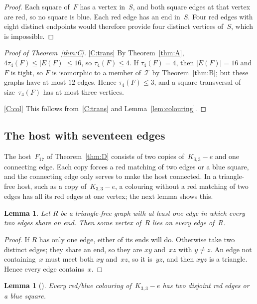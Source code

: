 \documentclass[11pt,letterpaper]{article}
\numberwithin{equation}{section}
\theoremstyle{plain}
\newtheorem{lemma}[theorem]{Lemma}
\theoremstyle{definition}
\theoremstyle{remark}
\newcommand{\Kme}{K_{3,3}-e}
\newcommand{\Tfam}{\mathcal{T}}
\begin{document}
\begin{proof}
Each square of~$F$ has a vertex in~$S$, and both square edges at that vertex are red, so no square is blue. Each red edge has an end in~$S$. Four red edges with eight distinct endpoints would therefore provide four distinct vertices of~$S$, which is impossible.
\end{proof}

\begin{proof}[Proof of Theorem~\ref{thm:C}]
\ref{C:trans} By Theorem~\ref{thm:A}, $4\tau_4(F)\le|E(F)|\le16$, so $\tau_4(F)\le4$. If $\tau_4(F)=4$, then $|E(F)|=16$ and $F$ is tight, so $F$ is isomorphic to a member of~$\Tfam$ by Theorem~\ref{thm:B}; but these graphs have at most $12$ edges. Hence $\tau_4(F)\le3$, and a square transversal of size~$\tau_4(F)$ has at most three vertices.

\ref{C:col} This follows from~\ref{C:trans} and Lemma~\ref{lem:colouring}.
\end{proof}


\subsection{The host with seventeen edges}

The host~$F_{17}$ of Theorem~\ref{thm:D} consists of two copies of~$\Kme$ and one connecting edge. Each copy forces a red matching of two edges or a blue square, and the connecting edge only serves to make the host connected. In a triangle-free host, such as a copy of~$\Kme$, a colouring without a red matching of two edges has all its red edges at one vertex; the next lemma shows this.

\begin{lemma}\label{lem:star}
Let $R$ be a triangle-free graph with at least one edge in which every two edges share an end. Then some vertex of~$R$ lies on every edge of~$R$.
\end{lemma}

\begin{proof}
If $R$ has only one edge, either of its ends will do. Otherwise take two distinct edges; they share an end, so they are $xy$ and~$xz$ with $y\ne z$. An edge not containing~$x$ must meet both $xy$ and~$xz$, so it is~$yz$, and then $xyz$ is a triangle. Hence every edge contains~$x$.
\end{proof}

\begin{lemma}[{\cite[Theorem~2.6]{WYBAS15}}]\label{lem:k33arrow}
Every red/blue colouring of~$\Kme$ has two disjoint red edges or a blue square.
\end{lemma}
\end{document}
